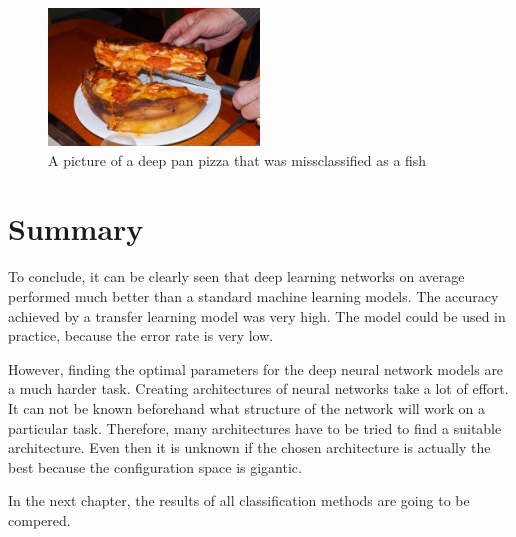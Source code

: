 \begin{figure}[h]
\centering
\includegraphics[width=0.5\textwidth]{Figures/4/4.jpg}
\caption{A picture of a deep pan pizza that was missclassified as a fish}
\label{fig:miss}
\end{figure}




\section{Summary}

To conclude, it can be clearly seen that deep learning networks on average performed much better than a standard machine learning models. The accuracy achieved by a transfer learning model was very high. The model could be used in practice, because the error rate is very low.

However, finding the optimal parameters for the deep neural network models are a much harder task. Creating architectures of neural networks take a lot of effort. It can not be known beforehand what structure of the network will work on a particular task. Therefore, many architectures have to be tried to find a suitable architecture. Even then it is unknown if the chosen architecture is actually the best because the configuration space is gigantic.

In the next chapter, the results of all classification methods are going to be compered.